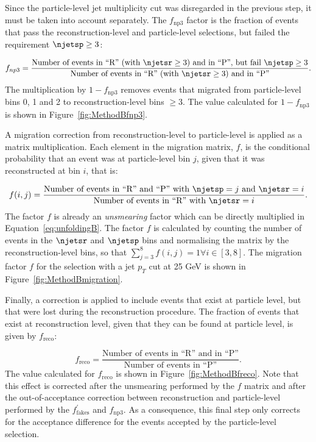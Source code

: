 Since the particle-level jet multiplicity cut was disregarded in the previous
step, it must be taken into account separately. The $f_{\mathrm{np3}}$ factor is the
fraction of events that pass the reconstruction-level and particle-level
selections, but failed the requirement $\njetsp \geq 3$:

\begin{equation}
\displaystyle
f_{np3} = \frac{\textrm{Number of events in ``R'' (with } \njetsr \geq 3 \textrm{) and in ``P'', but fail }\njetsp \geq 3}{\textrm{Number of events in ``R'' (with } \njetsr \geq 3 \textrm{) and in ``P''}}.
\label{eq:ttjets_fnp3}
\end{equation}
The
multiplication by $1 - f_{\mathrm{np3}}$ removes events that migrated from
particle-level bins 0, 1 and 2 to reconstruction-level bins $\geq 3$.
The value calculated for $1 - f_{\mathrm{np3}}$ is shown in Figure~\ref{fig:MethodBfnp3}.

A migration correction from reconstruction-level to particle-level
is applied as a matrix multiplication.
Each element in the migration matrix, $f$,
is the conditional probability
that an event was at particle-level bin $j$,
given that it was reconstructed at bin $i$, that is:

\begin{equation}
\displaystyle
f(i, j) = \frac{\textrm{Number of events in ``R'' and ``P'' with }\njetsp = j \textrm{ and }\njetsr = i}{\textrm{Number of events in ``R'' with }\njetsr = i}.
\label{eq:ttjets_f}
\end{equation}
The factor $f$ is already an \emph{unsmearing} factor
which can be directly multiplied in Equation~\ref{eq:unfoldingB}.
The factor $f$ is calculated by counting the number of events in the $\njetsr$
and $\njetsp$ bins and normalising the matrix by the reconstruction-level bins,
so that $\sum_{j=3}^{8} f(i, j) = 1 \forall i \in [3,8]$.
The migration factor $f$ for the selection with a jet $p_T$ cut at 25 GeV
is shown
in Figure~\ref{fig:MethodBmigration}.

Finally, a correction is applied to include events that exist
at particle level, but that were lost
during the reconstruction procedure.
The fraction of events that exist at reconstruction level,
given that they can be found at
particle level, is given by $f_{\mathrm{reco}}$:

\begin{equation}
\displaystyle
f_{\mathrm{reco}} = \frac{\textrm{Number of events in ``R'' and in ``P''}}{\textrm{Number of events in ``P''}}.
\label{eq:ttjets_freco}
\end{equation}
The value calculated for $f_{\mathrm{reco}}$ is shown in Figure~\ref{fig:MethodBfreco}.
Note that this effect is corrected after the unsmearing performed by the $f$ matrix and after the out-of-acceptance
correction between reconstruction and particle-level performed by the $f^{\prime}_{\textrm{fakes}}$ and $f_{\textrm{np3}}$.
As a consequence, this final step only corrects for the acceptance difference for the events accepted by the particle-level selection.

